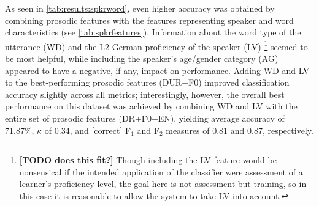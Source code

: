 \documentclass[a4paper]{article}
\newcommand{\TODO}[1]{{\color{red}\textbf{[TODO #1]}}}
\begin{document}
		As seen in \cref{tab:results:spkrword}, even higher accuracy was obtained by combining prosodic features with the features representing speaker and word characteristics (see \cref{tab:spkrfeatures}). Information about the word type of the utterance (WD) and the L2 German proficiency of the speaker (LV)%
		\footnote{\TODO{does this fit?} Though including the LV feature would be nonsensical if the intended application of the classifier were assessment of a learner's proficiency level, the goal here is not assessment but training, 
		so in this case it is reasonable to allow the system to take LV into account. }		
		 seemed to be most helpful, while including the speaker's age/gender category (AG) appeared to have a negative, if any, impact on performance. 
		Adding WD and LV to the best-performing prosodic features (DUR+F0) improved classification accuracy slightly across all metrics; interestingly, however, the overall best performance on this dataset was achieved by combining WD and LV with the entire set of prosodic features (DR+F0+EN), yielding average accuracy of 71.87\%, $\kappa$ of 0.34, and [correct] F$_1$ and F$_2$ measures of 0.81 and 0.87, respectively.
		
\end{document}
